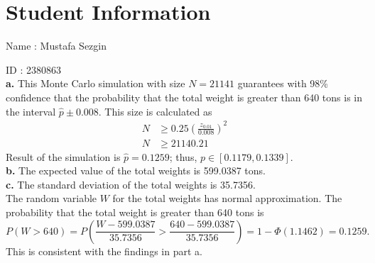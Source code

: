 \documentclass[12pt]{article}
\begin{document}
\section*{Student Information}

Name : Mustafa Sezgin

ID : 2380863 \\


\textbf{a.} This Monte Carlo simulation with size $N = 21141$ guarantees with 98\% confidence that the probability that the total weight is greater than 640 tons is in the interval $\hat{p} \pm 0.008$. This size is calculated as
\begin{align*}
    N &\ge 0.25 \left( \frac{z_{0.01}}{0.008} \right)^2 \\
    N &\ge 21140.21
\end{align*}
Result of the simulation is $\hat{p} = 0.1259$; thus, $p \in [0.1179, 0.1339]$. \\

\textbf{b.} The expected value of the total weights is 599.0387 tons. \\

\textbf{c.} The standard deviation of the total weights is 35.7356. \\

The random variable $W$ for the total weights has normal approximation. The probability that the total weight is greater than 640 tons is
\[
    P(W > 640) = P\left( \frac{W - 599.0387}{35.7356} > \frac{640 - 599.0387}{35.7356} \right) = 1 - \Phi(1.1462) = 0.1259.
\]
This is consistent with the findings in part a.
\end{document}
